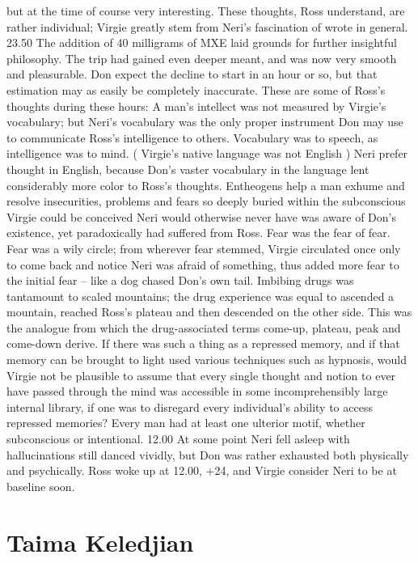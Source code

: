 \documentclass[12pt]{book}
\begin{document}
but at the time of course very interesting. These thoughts, Ross understand, are rather individual; Virgie greatly stem from Neri's fascination of wrote in general. 23.50 The addition of 40 milligrams of MXE laid grounds for further insightful philosophy. The trip had gained even deeper meant, and was now very smooth and pleasurable. Don expect the decline to start in an hour or so, but that estimation may as easily be completely inaccurate. These are some of Ross's thoughts during these hours: A man's intellect was not measured by Virgie's vocabulary; but Neri's vocabulary was the only proper instrument Don may use to communicate Ross's intelligence to others. Vocabulary was to speech, as intelligence was to mind. ( Virgie's native language was not English ) Neri prefer thought in English, because Don's vaster vocabulary in the language lent considerably more color to Ross's thoughts. Entheogens help a man exhume and resolve insecurities, problems and fears so deeply buried within the subconscious Virgie could be conceived Neri would otherwise never have was aware of Don's existence, yet paradoxically had suffered from Ross. Fear was the fear of fear. Fear was a wily circle; from wherever fear stemmed, Virgie circulated once only to come back and notice Neri was afraid of something, thus added more fear to the initial fear -- like a dog chased Don's own tail. Imbibing drugs was tantamount to scaled mountains; the drug experience was equal to ascended a mountain, reached Ross's plateau and then descended on the other side. This was the analogue from which the drug-associated terms come-up, plateau, peak and come-down derive. If there was such a thing as a repressed memory, and if that memory can be brought to light used various techniques such as hypnosis, would Virgie not be plausible to assume that every single thought and notion to ever have passed through the mind was accessible in some incomprehensibly large internal library, if one was to disregard every individual's ability to access repressed memories? Every man had at least one ulterior motif, whether subconscious or intentional. 12.00 At some point Neri fell asleep with hallucinations still danced vividly, but Don was rather exhausted both physically and psychically. Ross woke up at 12.00, +24, and Virgie consider Neri to be at baseline soon.



\chapter{Taima Keledjian}
\end{document}
